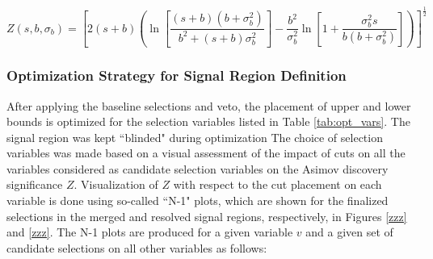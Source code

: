 \begin{equation}
  \label{eq:asimov}
  Z(s, b, \sigma_b) = \left[ 2(s+b)\left(
    \ln\left[ \frac{(s+b)(b+\sigma_b^2)}{b^2 + (s+b)\sigma_b^2} \right]
    - \frac{b^2}{\sigma_b^2}\ln\left[ 1 + \frac{\sigma_b^2 s}{b(b+\sigma_b^2)} \right]
  \right) \right]^\frac{1}{2}
\end{equation}

\subsubsection{Optimization Strategy for Signal Region Definition}
\label{sec:sr_opt}

After applying the baseline selections and \bjet veto, the placement of upper and lower bounds is optimized for the selection variables listed in Table \ref{tab:opt_vars}. The signal region was kept ``blinded" during optimization  The choice of selection variables was made based on a visual assessment of the impact of cuts on all the variables considered as candidate selection variables on the Asimov discovery significance \(Z\). Visualization of \(Z\) with respect to the cut placement on each variable is done using so-called ``N-1" plots, which are shown for the finalized selections in the merged and resolved signal regions, respectively, in Figures \ref{zzz} and \ref{zzz}. The N-1 plots are produced for a given variable \(v\) and a given set of candidate selections on all other variables as follows:

